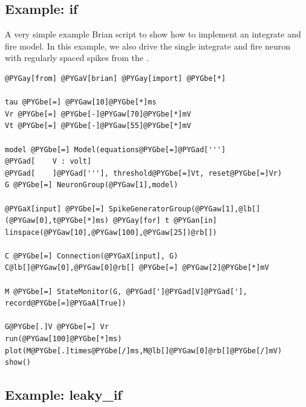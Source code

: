 \documentclass[letterpaper,10pt]{manual}
\begin{document}
\resetcurrentobjects
{}

\hypertarget{index-35}{}\subsection{Example: if}

A very simple example Brian script to show how to implement
an integrate and fire model. In this example, we also
drive the single integrate and fire neuron with
regularly spaced spikes from the \hyperlink{brian.SpikeGeneratorGroup}{}.

\begin{Verbatim}[commandchars=@\[\]]
@PYGay[from] @PYGaV[brian] @PYGay[import] @PYGbe[*]

tau @PYGbe[=] @PYGaw[10]@PYGbe[*]ms
Vr @PYGbe[=] @PYGbe[-]@PYGaw[70]@PYGbe[*]mV
Vt @PYGbe[=] @PYGbe[-]@PYGaw[55]@PYGbe[*]mV

model @PYGbe[=] Model(equations@PYGbe[=]@PYGad[''']
@PYGad[    V : volt]
@PYGad[    ]@PYGad['''], threshold@PYGbe[=]Vt, reset@PYGbe[=]Vr)
G @PYGbe[=] NeuronGroup(@PYGaw[1],model)

@PYGaX[input] @PYGbe[=] SpikeGeneratorGroup(@PYGaw[1],@lb[](@PYGaw[0],t@PYGbe[*]ms) @PYGay[for] t @PYGan[in] linspace(@PYGaw[10],@PYGaw[100],@PYGaw[25])@rb[])

C @PYGbe[=] Connection(@PYGaX[input], G)
C@lb[]@PYGaw[0],@PYGaw[0]@rb[] @PYGbe[=] @PYGaw[2]@PYGbe[*]mV

M @PYGbe[=] StateMonitor(G, @PYGad[']@PYGad[V]@PYGad['], record@PYGbe[=]@PYGaA[True])

G@PYGbe[.]V @PYGbe[=] Vr
run(@PYGaw[100]@PYGbe[*]ms)
plot(M@PYGbe[.]times@PYGbe[/]ms,M@lb[]@PYGaw[0]@rb[]@PYGbe[/]mV)
show()
\end{Verbatim}

\resetcurrentobjects
{}

\hypertarget{index-36}{}\subsection{Example: leaky\_if}
\end{document}
